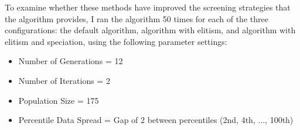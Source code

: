 To examine whether these methods have improved the screening strategies that the algorithm provides, I ran the algorithm 50 times for each of the three configurations: the default algorithm, algorithm with elitism, and algorithm with elitism and speciation, using the following parameter settings:
\begin{itemize}
    \item Number of Generations = 12
    \item Number of Iterations = 2
    \item Population Size = 175
    \item Percentile Data Spread = Gap of 2 between percentiles (2nd, 4th, ..., 100th)
\end{itemize}

\clearpage

\begin{figure}[p]
    \vspace{-25mm}
    {\centering
    \\}
\end{figure}

